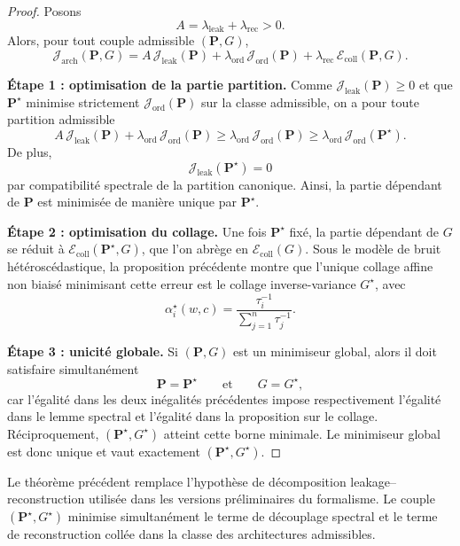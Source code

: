 \begin{proof}
Posons
\[
A=\lambda_{\mathrm{leak}}+\lambda_{\mathrm{rec}}>0.
\]
Alors, pour tout couple admissible \((\mathbf P,G)\),
\[
\mathcal J_{\mathrm{arch}}(\mathbf P,G)
=
A\,\mathcal J_{\mathrm{leak}}(\mathbf P)
+
\lambda_{\mathrm{ord}}\,\mathcal J_{\mathrm{ord}}(\mathbf P)
+
\lambda_{\mathrm{rec}}\,\mathcal E_{\mathrm{coll}}(\mathbf P,G).
\]

\medskip
\noindent
\textbf{Étape 1 : optimisation de la partie partition.}
Comme \(\mathcal J_{\mathrm{leak}}(\mathbf P)\ge 0\) et que \(\mathbf P^\star\) minimise strictement \(\mathcal J_{\mathrm{ord}}(\mathbf P)\) sur la classe admissible, on a pour toute partition admissible
\[
A\,\mathcal J_{\mathrm{leak}}(\mathbf P)+\lambda_{\mathrm{ord}}\,\mathcal J_{\mathrm{ord}}(\mathbf P)
\ge
\lambda_{\mathrm{ord}}\,\mathcal J_{\mathrm{ord}}(\mathbf P)
\ge
\lambda_{\mathrm{ord}}\,\mathcal J_{\mathrm{ord}}(\mathbf P^\star).
\]
De plus,
\[
\mathcal J_{\mathrm{leak}}(\mathbf P^\star)=0
\]
par compatibilité spectrale de la partition canonique.
Ainsi, la partie dépendant de \(\mathbf P\) est minimisée de manière unique par \(\mathbf P^\star\).

\medskip
\noindent
\textbf{Étape 2 : optimisation du collage.}
Une fois \(\mathbf P^\star\) fixé, la partie dépendant de \(G\) se réduit à \(\mathcal E_{\mathrm{coll}}(\mathbf P^\star,G)\), que l'on abrège en \(\mathcal E_{\mathrm{coll}}(G)\).
Sous le modèle de bruit hétéroscédastique, la proposition précédente montre que l'unique collage affine non biaisé minimisant cette erreur est le collage inverse-variance \(G^\star\), avec
\[
\alpha_i^\star(w,c)=\frac{\tau_i^{-1}}{\sum_{j=1}^n\tau_j^{-1}}.
\]

\medskip
\noindent
\textbf{Étape 3 : unicité globale.}
Si \((\mathbf P,G)\) est un minimiseur global, alors il doit satisfaire simultanément
\[
\mathbf P=\mathbf P^\star
\qquad\text{et}\qquad
G=G^\star,
\]
car l'égalité dans les deux inégalités précédentes impose respectivement l'égalité dans le lemme spectral et l'égalité dans la proposition sur le collage.
Réciproquement, \((\mathbf P^\star,G^\star)\) atteint cette borne minimale.
Le minimiseur global est donc unique et vaut exactement \((\mathbf P^\star,G^\star)\).
\end{proof}

\begin{remark}
Le théorème précédent remplace l'hypothèse de décomposition leakage--reconstruction utilisée dans les versions préliminaires du formalisme.
Le couple \((\mathbf P^\star,G^\star)\) minimise simultanément le terme de découplage spectral et le terme de reconstruction collée dans la classe des architectures admissibles.
\end{remark}

